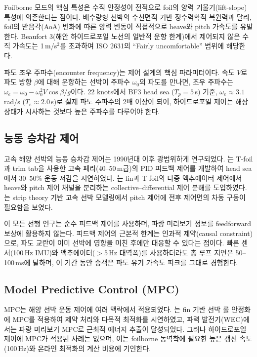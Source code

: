\documentclass[11pt]{report}
\numberwithin{equation}{chapter}
\numberwithin{figure}{chapter}
\numberwithin{table}{chapter}
\begin{document}
Foilborne 모드의 핵심 특성은 수직 안정성이 전적으로
foil의 양력 기울기(lift-slope) 특성에 의존한다는 점이다.
배수량형 선박의 수선면적 기반 정수력학적 복원력과 달리,
foil의 받음각(AoA) 변화에 따른 양력 변동이 직접적으로
heave와 pitch 가속도를 유발한다.
Beaufort 3(해안 하이드로포일 노선의 일반적 운항 한계)에서
제어되지 않은 수직 가속도는 1\,m/s$^2$를 초과하여
ISO 2631의 ``Fairly uncomfortable'' 범위에 해당한다.

파도 조우 주파수(encounter frequency)는 제어 설계의 핵심 파라미터이다.
속도 $V$로 파도 방향 $\beta$에 대해 운항하는 선박이 주파수 $\omega_0$의
파도를 만나면, 조우 주파수는
$\omega_e = \omega_0 - \omega_0^2 V \cos\beta / g$이다.
22 knots에서 BF3 head sea ($T_p = 5$\,s) 기준, $\omega_e \approx 3.1$\,rad/s
($T_e \approx 2.0$\,s)로 실제 파도 주파수의 2배 이상이 되어,
하이드로포일 제어는 해상 상태가 시사하는 것보다 높은 주파수를 다루어야 한다.

\subsection{능동 승차감 제어}

고속 해양 선박의 능동 승차감 제어는 1990년대 이후 광범위하게 연구되었다.
\citet{Haywood1995}는 T-foil과 trim tab을 사용한 고속 페리(40--50\,m급)의
PID 피드백 제어를 개발하여 head sea에서 30--50\% 운동 저감을 시연하였다.
\citet{GironSierra2001}는 fin과 T-foil의 다중 액추에이터 제어에서
heave와 pitch 제어 채널을 분리하는 collective--differential 제어 분해를 도입하였다.
\citet{Esteban2005}는 strip theory 기반 고속 선박 모델링에서
pitch 제어에 전후 제어면의 차동 구동이 필요함을 보였다.

이 모든 선행 연구는 순수 피드백 제어를 사용하며,
파랑 미리보기 정보를 feedforward 보상에 활용하지 않는다.
피드백 제어의 근본적 한계는 인과적 제약(causal constraint)으로,
파도 교란이 이미 선박에 영향을 미친 후에만 대응할 수 있다는 점이다.
빠른 센서(100\,Hz IMU)와 액추에이터($>$5\,Hz 대역폭)를 사용하더라도
총 루프 지연은 50--100\,ms에 달하며, 이 기간 동안 승객은
파도 유기 가속도 피크를 그대로 경험한다.

\subsection{Model Predictive Control (MPC)}

MPC는 해양 선박 운동 제어에 여러 맥락에서 적용되었다.
\citet{Perez2005}는 fin 기반 선박 롤 안정화에 MPC를 적용하여
제약 처리와 다목적 최적화를 시연하였고,
파력 발전기(WEC)에서는 파랑 미리보기 MPC로 근최적 에너지 추출이 달성되었다.
그러나 하이드로포일 제어에 MPC가 적용된 사례는 없으며,
이는 foilborne 동역학에 필요한 높은 갱신 속도(100\,Hz)와
온라인 최적화의 계산 비용에 기인한다.
\end{document}

